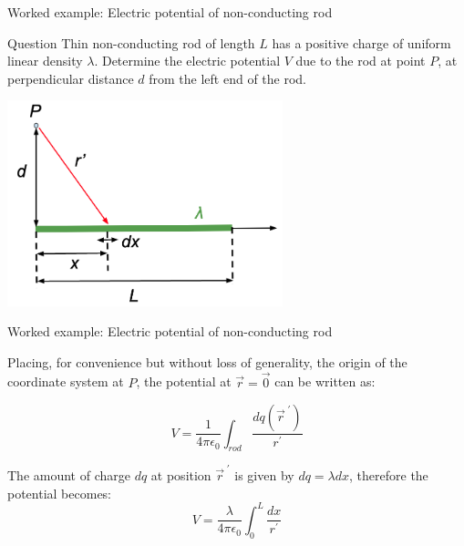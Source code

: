 %
%

{
\problemslide

%
%
%

\begin{frame}{Worked example: Electric potential of non-conducting rod}

\begin{blockexmplque}{Question}
Thin non-conducting rod of length $L$ has a positive charge of uniform linear
density $\lambda$. Determine the electric potential $V$ due to the rod at point
$P$, at perpendicular distance $d$ from the left end of the rod.
\end{blockexmplque}

\begin{center}
  \includegraphics[width=0.60\textwidth]{./images/problems/lect03_potential_rod}
\end{center}

\end{frame}

%
%
%

\begin{frame}{Worked example: Electric potential of non-conducting rod}

Placing, for convenience but without loss of generality, the origin of the
coordinate system at $P$, the potential at $\vec{r}=\vec{0}$ can be written as:

\begin{equation*}
    V = \frac{1}{4\pi\epsilon_0} \int_{rod} \frac{dq(\vec{r}^{\;\prime})}{r^\prime}
\end{equation*}

\vspace{0.2cm}

The amount of charge $dq$ at position $\vec{r}^{\;\prime}$ is given by
$dq = \lambda dx$, therefore the potential becomes:
\begin{equation*}
    V = \frac{\lambda}{4\pi\epsilon_0} \int_{0}^{L} \frac{dx}{r^\prime}
\end{equation*}


\end{frame}}
